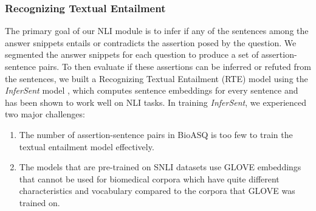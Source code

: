 \documentclass[11pt,a4paper]{article}
\begin{document}

\subsubsection{Recognizing Textual Entailment}

The primary goal of our NLI module is to infer if any of the sentences among the answer snippets entails or contradicts the assertion posed by the question. We segmented the answer snippets for each question to produce a set of assertion-sentence pairs. To then evaluate if these assertions can be inferred or refuted from the sentences, we built a Recognizing Textual Entailment (RTE) model using the \textit{InferSent} model \cite{Infersent}, which computes sentence embeddings for every sentence and has been shown to work well on NLI tasks. In training \textit{InferSent}, we experienced two major challenges:

\begin{enumerate}
    \item The number of assertion-sentence pairs in BioASQ is too few to train the textual entailment model effectively.
    \item The models that are pre-trained on SNLI \cite{snli}
    datasets use GLOVE \cite{glove} embeddings that cannot be used for biomedical corpora which have quite different characteristics and vocabulary compared to the corpora that GLOVE was trained on.
\end{enumerate}
\end{document}
